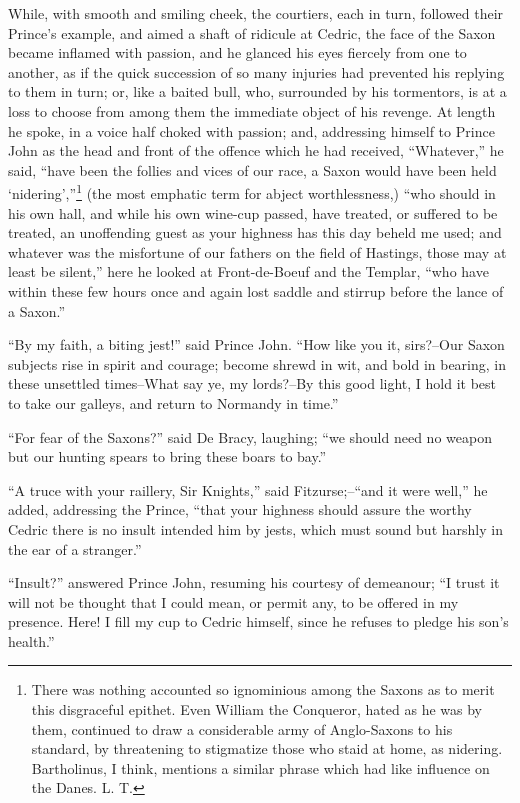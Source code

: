 While, with smooth and smiling cheek, the courtiers, each in turn,
followed their Prince's example, and aimed a shaft of ridicule at
Cedric, the face of the Saxon became inflamed with passion, and he
glanced his eyes fiercely from one to another, as if the quick
succession of so many injuries had prevented his replying to them in
turn; or, like a baited bull, who, surrounded by his tormentors, is at a
loss to choose from among them the immediate object of his revenge. At
length he spoke, in a voice half choked with passion; and, addressing
himself to Prince John as the head and front of the offence which he had
received, ``Whatever,'' he said, ``have been the follies and vices of
our race, a Saxon would have been held `nidering',''\footnote{There was
nothing accounted so ignominious among the
Saxons as to merit this disgraceful epithet. Even William the Conqueror,
hated as he was by them, continued to draw a considerable army of
Anglo-Saxons to his standard, by threatening to stigmatize those who
staid at home, as nidering. Bartholinus, I think, mentions a similar
phrase which had like influence on the Danes. L. T.} (the most
emphatic term for abject worthlessness,) ``who should in his own hall,
and while his own wine-cup passed, have treated, or suffered to be
treated, an unoffending guest as your highness has this day beheld me
used; and whatever was the misfortune of our fathers on the field of
Hastings, those may at least be silent,'' here he looked at
Front-de-Boeuf and the Templar, ``who have within these few hours once
and again lost saddle and stirrup before the lance of a Saxon.''

``By my faith, a biting jest!'' said Prince John. ``How like you it,
sirs?--Our Saxon subjects rise in spirit and courage; become shrewd in
wit, and bold in bearing, in these unsettled times--What say ye, my
lords?--By this good light, I hold it best to take our galleys, and
return to Normandy in time.''

``For fear of the Saxons?'' said De Bracy, laughing; ``we should need no
weapon but our hunting spears to bring these boars to bay.''

``A truce with your raillery, Sir Knights,'' said Fitzurse;--``and it
were well,'' he added, addressing the Prince, ``that your highness
should assure the worthy Cedric there is no insult intended him by
jests, which must sound but harshly in the ear of a stranger.''

``Insult?'' answered Prince John, resuming his courtesy of demeanour;
``I trust it will not be thought that I could mean, or permit any, to be
offered in my presence. Here! I fill my cup to Cedric himself, since he
refuses to pledge his son's health.''

